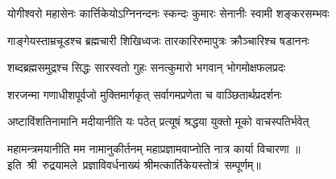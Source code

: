 

\twolineshloka
{योगीश्वरो महासेनः कार्त्तिकेयोऽग्निनन्दनः}
{स्कन्दः कुमारः सेनानीः स्वामी शङ्करसम्भवः}

\twolineshloka
{गाङ्गेयस्ताम्रचूडश्च ब्रह्मचारी शिखिध्वजः}
{तारकारिरुमापुत्रः क्रौञ्चारिश्च षडाननः}

\twolineshloka
{शब्दब्रह्मसमुद्रश्च सिद्धः सारस्वतो गुहः}
{सनत्कुमारो भगवान् भोगमोक्षफलप्रदः}

\twolineshloka
{शरजन्मा गणाधीशपूर्वजो मुक्तिमार्गकृत्}
{सर्वागमप्रणेता च वाञ्छितार्थप्रदर्शनः}

\twolineshloka
{अष्टाविंशतिनामानि मदीयानीति यः पठेत्}
{प्रत्यूषं श्रद्धया युक्तो मूको वाचस्पतिर्भवेत्}

\twolineshloka
{महामन्त्रमयानीति मम नामानुकीर्तनम्}
{महाप्रज्ञामवाप्नोति नात्र कार्या विचारणा}
॥इति~श्री~रुद्रयामले~प्रज्ञाविवर्धनाख्यं श्रीमत्कार्तिकेयस्तोत्रं~सम्पूर्णम्॥